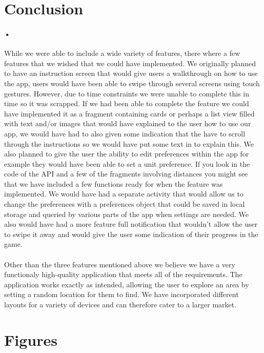 \documentclass[10pt, a4paper]{article}
\begin{document}
\section*{Conclusion}
\paragraph*{•}
While we were able to include a wide variety of features, there where a few features that we wished that we could have implemented. We originally planned to have an instruction screen that would give users a walkthrough on how to use the app, users would have been able to swipe through several screens using touch gestures. However, due to time constraints we were unable to complete this in time so it was scrapped. If we had been able to complete the feature we could have implemented it as a fragment containing cards or perhaps a list view filled with text and/or images that would have explained to the user how to use our app, we would have had to also given some indication that the have to scroll through the instructions so we would have put some text in to explain this. We also planned to give the user the ability to edit preferences within the app for example they would have been able to set a unit preference. If you look in the code of the API and a few of the fragments involving distances you might see that we have included a few functions ready for when the feature was implemented. We would have had a separate activity that would allow us to change the preferences with a preferences object that could be saved in local storage and queried by various parts of the app when settings are needed. We also would have had a more feature full notification that wouldn't allow the user to swipe it away and would give the user some indication of their progress in the game.
\paragraph*{}
Other than the three features mentioned above we believe we have a very functionaly high-quality application that meets all of the requirements. The application works exactly as intended, allowing the user to explore an area by setting a random location for them to find. We have incorporated different layouts for a variety of devices and can therefore cater to a larger market.

\newpage

\section*{Figures}
\end{document}
